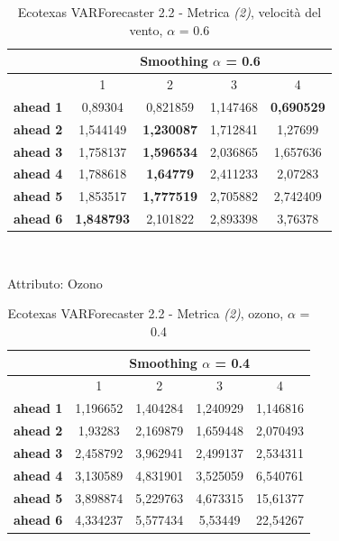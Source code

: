 \documentclass[12pt,a4paper,oneside,openright]{book}
\begin{document}
\medskip

\begin{table}[H]
\centering
\begin{tabular}{|c|c|c|c|c|}
\hline
 & \multicolumn{4}{|c|}{Smoothing $\alpha$ = 0.6} \\
\hline
& 1 & 2 & 3 & 4 \\
\hline
\textbf{ahead 1} & 0,89304 & 0,821859 & 1,147468 & \textbf{0,690529}\\
\hline
\textbf{ahead 2} & 1,544149 & \textbf{1,230087} & 1,712841 & 1,27699\\ 
\hline
\textbf{ahead 3} & 1,758137 & \textbf{1,596534} & 2,036865 & 1,657636\\
\hline
\textbf{ahead 4} & 1,788618 & \textbf{1,64779} & 2,411233 & 2,07283\\ 
\hline
\textbf{ahead 5} & 1,853517 & \textbf{1,777519} & 2,705882 & 2,742409\\
\hline
\textbf{ahead 6} & \textbf{1,848793} & 2,101822 & 2,893398 & 3,76378\\ 
\hline
\end{tabular} \\
\caption{Ecotexas VARForecaster 2.2 - Metrica \textit{(2)}, velocità del vento, $\alpha$ = 0.6}
\end{table}

\medskip

Attributo: Ozono \\ 

\begin{table}[H]
\centering
\begin{tabular}{|c|c|c|c|c|}
\hline
 & \multicolumn{4}{|c|}{Smoothing $\alpha$ = 0.4} \\
\hline
& 1 & 2 & 3 & 4 \\
\hline
\textbf{ahead 1} & 1,196652 & 1,404284 & 1,240929 & 1,146816\\
\hline
\textbf{ahead 2} &  1,93283 & 2,169879 & 1,659448 & 2,070493\\ 
\hline
\textbf{ahead 3} & 2,458792 & 3,962941 & 2,499137 & 2,534311\\
\hline
\textbf{ahead 4} & 3,130589 & 4,831901 & 3,525059 & 6,540761\\ 
\hline
\textbf{ahead 5} & 3,898874 & 5,229763 & 4,673315 & 15,61377\\
\hline
\textbf{ahead 6} & 4,334237 & 5,577434 & 5,53449 & 22,54267\\ 
\hline
\end{tabular} \\
\caption{Ecotexas VARForecaster 2.2 - Metrica \textit{(2)}, ozono, $\alpha$ = 0.4}
\end{table}
\end{document}

